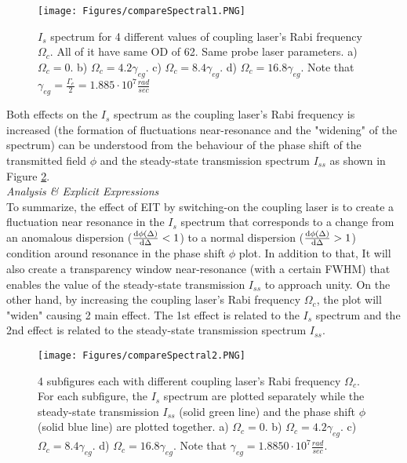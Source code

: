 \begin{figure}[h!]
    \centering
    \texttt{[image: Figures/compareSpectral1.PNG]}
    \caption{$I_{s}$ spectrum for 4 different values of coupling laser's Rabi frequency $\Omega_{c}$. All of it have same OD of 62. Same probe laser parameters. a) $\Omega_{c} = 0$. b) $\Omega_{c} = 4.2\gamma_{eg}$. c) $\Omega_{c} = 8.4\gamma_{eg}$. d) $\Omega_{c} = 16.8\gamma_{eg}$. Note that $\gamma_{eg} = \frac{\Gamma_{e}}{2} = 1.885 \cdot 10^{7} \frac{rad}{sec}$}
    \label{fig: compare Is spectrums}
\end{figure}

Both effects on the $I_{s}$ spectrum as the coupling laser's Rabi frequency is increased (the formation of fluctuations near-resonance and the "widening" of the spectrum) can be understood from the behaviour of the phase shift of the transmitted field $\phi$ and the steady-state transmission spectrum $I_{ss}$ as shown in Figure \ref{fig: Is compared to transmission & phase shift}.\\

\textit{Analysis & Explicit Expressions}\\

To summarize, the effect of EIT by switching-on the coupling laser is to create a fluctuation near resonance in the $I_{s}$ spectrum that corresponds to a change from an anomalous dispersion ($\dv{\phi(\Delta)}{\Delta} < 1$) to a normal dispersion ($\dv{\phi(\Delta)}{\Delta} > 1$) condition around resonance in the phase shift $\phi$ plot. In addition to that, It will also create a transparency window near-resonance (with a certain FWHM) that enables the value of the steady-state transmission $I_{ss}$ to approach unity. On the other hand, by increasing the coupling laser's Rabi frequency $\Omega_{c}$, the plot will "widen" causing 2 main effect. The 1st effect is related to the $I_{s}$ spectrum and the 2nd effect is related to the steady-state transmission spectrum $I_{ss}$.

\begin{figure}[h!]
    \centering
    \texttt{[image: Figures/compareSpectral2.PNG]}
    \caption{4 subfigures each with different coupling laser's Rabi frequency $\Omega_{c}$. For each subfigure, the $I_{s}$ spectrum are plotted separately while the steady-state transmission $I_{ss}$ (solid green line) and the phase shift $\phi$ (solid blue line) are plotted together. a) $\Omega_{c} = 0$. b) $\Omega_{c} = 4.2\gamma_{eg}$. c) $\Omega_{c} = 8.4\gamma_{eg}$. d) $\Omega_{c} = 16.8\gamma_{eg}$. Note that $\gamma_{eg} = 1.8850 \cdot 10^{7} \frac{rad}{sec}$.}
    \label{fig: Is compared to transmission & phase shift}
\end{figure}

